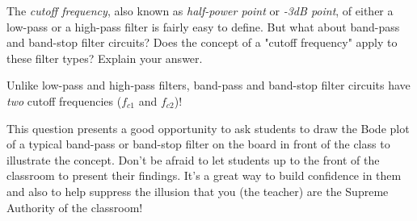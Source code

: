 

The {\it cutoff frequency}, also known as {\it half-power point} or {\it -3dB point}, of either a low-pass or a high-pass filter is fairly easy to define.  But what about band-pass and band-stop filter circuits?  Does the concept of a "cutoff frequency" apply to these filter types?  Explain your answer.







Unlike low-pass and high-pass filters, band-pass and band-stop filter circuits have {\it two} cutoff frequencies ($f_{c1}$ and $f_{c2}$)!







This question presents a good opportunity to ask students to draw the Bode plot of a typical band-pass or band-stop filter on the board in front of the class to illustrate the concept.  Don't be afraid to let students up to the front of the classroom to present their findings.  It's a great way to build confidence in them and also to help suppress the illusion that you (the teacher) are the Supreme Authority of the classroom!




